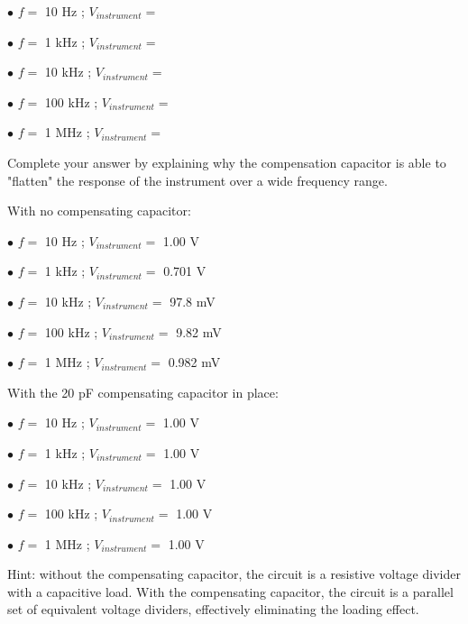 \medskip
\item{$\bullet$} $f =$ 10 Hz ; $V_{instrument} =$
\item{$\bullet$} $f =$ 1 kHz ; $V_{instrument} =$
\item{$\bullet$} $f =$ 10 kHz ; $V_{instrument} =$
\item{$\bullet$} $f =$ 100 kHz ; $V_{instrument} =$
\item{$\bullet$} $f =$ 1 MHz ; $V_{instrument} =$
\medskip

Complete your answer by explaining why the compensation capacitor is able to "flatten" the response of the instrument over a wide frequency range.







With no compensating capacitor:

\medskip
\item{$\bullet$} $f =$ 10 Hz ; $V_{instrument} =$ 1.00 V
\item{$\bullet$} $f =$ 1 kHz ; $V_{instrument} =$ 0.701 V
\item{$\bullet$} $f =$ 10 kHz ; $V_{instrument} =$ 97.8 mV
\item{$\bullet$} $f =$ 100 kHz ; $V_{instrument} =$ 9.82 mV
\item{$\bullet$} $f =$ 1 MHz ; $V_{instrument} =$ 0.982 mV
\medskip

\vskip 10pt

With the 20 pF compensating capacitor in place:

\medskip
\item{$\bullet$} $f =$ 10 Hz ; $V_{instrument} =$ 1.00 V
\item{$\bullet$} $f =$ 1 kHz ; $V_{instrument} =$ 1.00 V
\item{$\bullet$} $f =$ 10 kHz ; $V_{instrument} =$ 1.00 V
\item{$\bullet$} $f =$ 100 kHz ; $V_{instrument} =$ 1.00 V
\item{$\bullet$} $f =$ 1 MHz ; $V_{instrument} =$ 1.00 V
\medskip

\vskip 10pt

Hint: without the compensating capacitor, the circuit is a resistive voltage divider with a capacitive load.  With the compensating capacitor, the circuit is a parallel set of equivalent voltage dividers, effectively eliminating the loading effect.

\vskip 10pt


